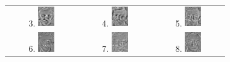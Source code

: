 \documentclass[10pt,a4paper]{article}
\begin{document}
\begin{figure}[h!]
\begin{tabular}{ c c c }
    3. \includegraphics[width=0.25\textwidth]{PrincipalComponent3.jpg} & 4. \includegraphics[width=0.25\textwidth]{PrincipalComponent4.jpg} & 5. \includegraphics[width=0.25\textwidth]{PrincipalComponent5.jpg} \\
    6. \includegraphics[width=0.25\textwidth]{PrincipalComponent6.jpg} & 7. \includegraphics[width=0.25\textwidth]{PrincipalComponent7.jpg} & 8. \includegraphics[width=0.25\textwidth]{PrincipalComponent8.jpg} \\

\end{tabular}
\end{figure}
\end{document}
